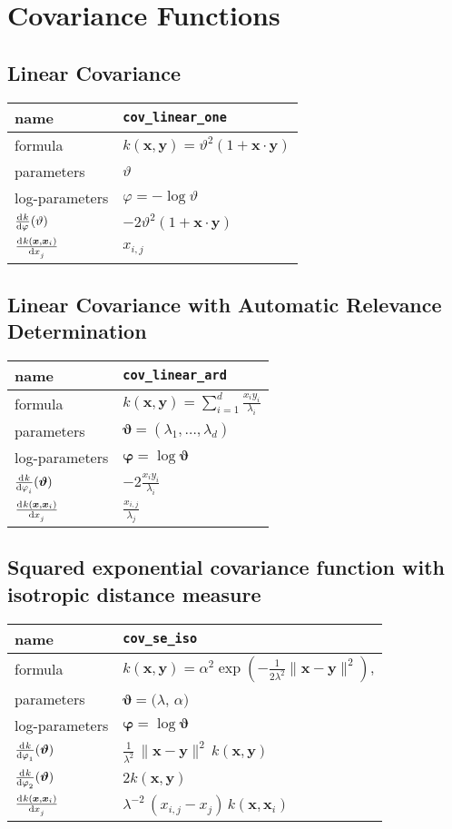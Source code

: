 \documentclass{article}
\newcommand{\NL}{\\ \midrule} %
\newcommand{\bx}{\bm{x}}
\newcommand{\by}{\bm{y}}
\newcommand{\btheta}{\bm{\vartheta}}
\newcommand{\bphi}{\bm{\varphi}}
\begin{document}
\section{Covariance Functions}

\subsection{Linear Covariance}

\begin{tabularx}{\textwidth}{@{} X X @{}}
%
name & \verb|cov_linear_one| \NL 
 formula & $ k(\bx,\by) = \vartheta^2 (1+\bm{x}\cdot \bm{y}) $ \NL
% 
parameters & $\vartheta$  \NL
% 
log-parameters & $\varphi = -\log \vartheta$  \NL
%
$\displaystyle \od{k}{\varphi}(\vartheta)$ & $ -2\vartheta^2 (1+\bm{x}\cdot \bm{y}) $ \NL 
%
$\displaystyle \od{k(\bx, \bx_i)}{x_j}$ & $ x_{i,j} $ \NL 
\end{tabularx}






\subsection{Linear Covariance with Automatic Relevance Determination}


\begin{tabularx}{\textwidth}{@{} X X @{}}
%
name & \verb|cov_linear_ard|  \NL
 formula &  $\displaystyle  k(\bx,\by) = \sum_{i=1}^d \frac{ {x}_i {y}_i }{ \lambda_i } $  \NL
% 
parameters & $\bm{\vartheta} = ( \lambda_1,\ldots,\lambda_d ) $ \NL
% 
log-parameters & $\bphi= \log \btheta$  \NL
%
$\displaystyle \od{k}{\varphi_i}(\btheta)$ & $ \displaystyle -2 \frac{ {x}_i {y}_i }{ \lambda_i } $ \NL 
%
%
$\displaystyle \od{k(\bx, \bx_i)}{x_j}$ & $  \displaystyle   \frac{x_{i,j}}{\lambda_j} $ \NL 
\end{tabularx}







\subsection{Squared exponential covariance function with isotropic distance measure}

\begin{tabularx}{\textwidth}{@{} X X @{}}
%
name & \verb|cov_se_iso|  \NL
 formula &  $\displaystyle k(\bx,\by) = \alpha^2 \exp\left( -\frac{1}{2\lambda^2} \|\bm{x}-\bm{y}  \|^2 \right) $,  \NL
% 
parameters &  $\btheta = ( \lambda$, $\alpha)$ \NL
% 
log-parameters & $\bphi  = \log \btheta $ \NL
%
$\displaystyle \od{k}{\varphi_1}(\btheta)$ & $\displaystyle \frac{1}{\lambda^2}\,  \|\bx-\by\|^2 \, k(\bx,\by)$ \NL
$\displaystyle \od{k}{\varphi_2}(\btheta)$ & $2 k(\bx,\by)$ \NL
%
$\displaystyle \od{k(\bx, \bx_i)}{x_j}$ & $  \displaystyle  \lambda^{-2} \, (x_{i,j}-x_j) \,  k(\bx,\bx_i) $ \NL 
\end{tabularx}
\end{document}
